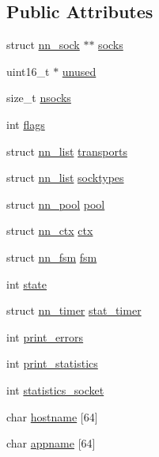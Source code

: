 \subsection*{Public Attributes}
\begin{DoxyCompactItemize}
\item 
struct \hyperlink{structnn__sock}{nn\+\_\+sock} $\ast$$\ast$ \hyperlink{structnn__global_a2d4ac1ec0821fd73d64164024c6ac34a}{socks}
\item 
uint16\+\_\+t $\ast$ \hyperlink{structnn__global_adfca766f62f1d6fa7f676453083c71e7}{unused}
\item 
size\+\_\+t \hyperlink{structnn__global_a6edb3dc50e3cbda2500c9ed057d9c54b}{nsocks}
\item 
int \hyperlink{structnn__global_a14a59ff08fbab1ca0a02b1de0c1aa3d4}{flags}
\item 
struct \hyperlink{structnn__list}{nn\+\_\+list} \hyperlink{structnn__global_a5ebc096d525d2628fabd293dfaccc064}{transports}
\item 
struct \hyperlink{structnn__list}{nn\+\_\+list} \hyperlink{structnn__global_a13fbf4096f84ad16e1d972b693e17ab3}{socktypes}
\item 
struct \hyperlink{structnn__pool}{nn\+\_\+pool} \hyperlink{structnn__global_a00121159df6225e24a85fa9239e0572c}{pool}
\item 
struct \hyperlink{structnn__ctx}{nn\+\_\+ctx} \hyperlink{structnn__global_a785576884be1ca2618171882c8fb797e}{ctx}
\item 
struct \hyperlink{structnn__fsm}{nn\+\_\+fsm} \hyperlink{structnn__global_a4a70871e752cab1ff856b584d64ec63b}{fsm}
\item 
int \hyperlink{structnn__global_ac3e476bf3985bb063e646c725622f5f9}{state}
\item 
struct \hyperlink{structnn__timer}{nn\+\_\+timer} \hyperlink{structnn__global_a7b245b5376cf63a243f5b27a4a10a805}{stat\+\_\+timer}
\item 
int \hyperlink{structnn__global_abbd632a22981ef3e4cefbe273a47c36f}{print\+\_\+errors}
\item 
int \hyperlink{structnn__global_a3d435991b706e1573fe7e74854f84185}{print\+\_\+statistics}
\item 
int \hyperlink{structnn__global_a1e2fa6c4aa9ab985db67d12002095509}{statistics\+\_\+socket}
\item 
char \hyperlink{structnn__global_a5c5b258b0ace109bb10a1e007429725e}{hostname} \mbox{[}64\mbox{]}
\item 
char \hyperlink{structnn__global_a6c0970e479ba853119a5ecf5e858a29e}{appname} \mbox{[}64\mbox{]}
\end{DoxyCompactItemize}


